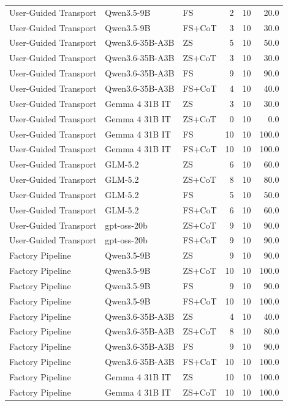 \begin{longtable}{lllrrr}
User-Guided Transport & Qwen3.5-9B & FS & 2 & 10 & 20.0 \\
User-Guided Transport & Qwen3.5-9B & FS+CoT & 3 & 10 & 30.0 \\
User-Guided Transport & Qwen3.6-35B-A3B & ZS & 5 & 10 & 50.0 \\
User-Guided Transport & Qwen3.6-35B-A3B & ZS+CoT & 3 & 10 & 30.0 \\
User-Guided Transport & Qwen3.6-35B-A3B & FS & 9 & 10 & 90.0 \\
User-Guided Transport & Qwen3.6-35B-A3B & FS+CoT & 4 & 10 & 40.0 \\
User-Guided Transport & Gemma 4 31B IT & ZS & 3 & 10 & 30.0 \\
User-Guided Transport & Gemma 4 31B IT & ZS+CoT & 0 & 10 & 0.0 \\
User-Guided Transport & Gemma 4 31B IT & FS & 10 & 10 & 100.0 \\
User-Guided Transport & Gemma 4 31B IT & FS+CoT & 10 & 10 & 100.0 \\
User-Guided Transport & GLM-5.2 & ZS & 6 & 10 & 60.0 \\
User-Guided Transport & GLM-5.2 & ZS+CoT & 8 & 10 & 80.0 \\
User-Guided Transport & GLM-5.2 & FS & 5 & 10 & 50.0 \\
User-Guided Transport & GLM-5.2 & FS+CoT & 6 & 10 & 60.0 \\
User-Guided Transport & gpt-oss-20b & ZS+CoT & 9 & 10 & 90.0 \\
User-Guided Transport & gpt-oss-20b & FS+CoT & 9 & 10 & 90.0 \\
Factory Pipeline & Qwen3.5-9B & ZS & 9 & 10 & 90.0 \\
Factory Pipeline & Qwen3.5-9B & ZS+CoT & 10 & 10 & 100.0 \\
Factory Pipeline & Qwen3.5-9B & FS & 9 & 10 & 90.0 \\
Factory Pipeline & Qwen3.5-9B & FS+CoT & 10 & 10 & 100.0 \\
Factory Pipeline & Qwen3.6-35B-A3B & ZS & 4 & 10 & 40.0 \\
Factory Pipeline & Qwen3.6-35B-A3B & ZS+CoT & 8 & 10 & 80.0 \\
Factory Pipeline & Qwen3.6-35B-A3B & FS & 9 & 10 & 90.0 \\
Factory Pipeline & Qwen3.6-35B-A3B & FS+CoT & 10 & 10 & 100.0 \\
Factory Pipeline & Gemma 4 31B IT & ZS & 10 & 10 & 100.0 \\
Factory Pipeline & Gemma 4 31B IT & ZS+CoT & 10 & 10 & 100.0 \\

\end{longtable}
